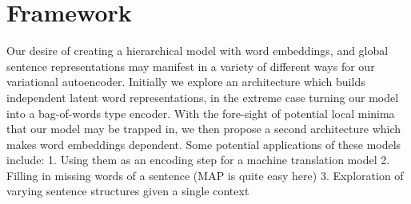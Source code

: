 \documentclass[journal, 12pt, draftcls, onecolumn]{IEEEtran}
\begin{document}
\section {Framework} \label{framework}
Our desire of creating a hierarchical model with word embeddings, and global sentence representations may manifest in a variety of different ways for our variational autoencoder. Initially we explore an architecture which builds independent latent word representations, in the extreme case turning our model into a bag-of-words type encoder. With the fore-sight of potential local minima that our model may be trapped in, we then propose a second architecture which makes word embeddings dependent. Some potential applications of these models include:
1. Using them as an encoding step for a machine translation model
2. Filling in missing words of a sentence (MAP is quite easy here)
3. Exploration of varying sentence structures given a single context
\end{document}
